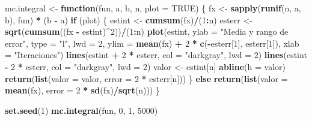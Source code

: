 \documentclass[
]{book}
\newenvironment{Shaded}{\begin{snugshade}}{\end{snugshade}}
\newcommand{\ControlFlowTok}[1]{\textcolor[rgb]{0.13,0.29,0.53}{\textbf{#1}}}
\newcommand{\DataTypeTok}[1]{\textcolor[rgb]{0.13,0.29,0.53}{#1}}
\newcommand{\DecValTok}[1]{\textcolor[rgb]{0.00,0.00,0.81}{#1}}
\newcommand{\KeywordTok}[1]{\textcolor[rgb]{0.13,0.29,0.53}{\textbf{#1}}}
\newcommand{\NormalTok}[1]{#1}
\newcommand{\OperatorTok}[1]{\textcolor[rgb]{0.81,0.36,0.00}{\textbf{#1}}}
\newcommand{\OtherTok}[1]{\textcolor[rgb]{0.56,0.35,0.01}{#1}}
\newcommand{\StringTok}[1]{\textcolor[rgb]{0.31,0.60,0.02}{#1}}
\theoremstyle{break}
\theoremstyle{definition}
\theoremstyle{definition}
\theoremstyle{definition}
\theoremstyle{remark}
\begin{document}
\begin{Shaded}
\begin{Highlighting}[]
\NormalTok{  mc.integral <-}\StringTok{ }\ControlFlowTok{function}\NormalTok{(fun, a, b, n, }\DataTypeTok{plot =} \OtherTok{TRUE}\NormalTok{) \{}
\NormalTok{    fx <-}\StringTok{ }\KeywordTok{sapply}\NormalTok{(}\KeywordTok{runif}\NormalTok{(n, a, b), fun) }\OperatorTok{*}\StringTok{ }\NormalTok{(b }\OperatorTok{-}\StringTok{ }\NormalTok{a)}
    \ControlFlowTok{if}\NormalTok{ (plot) \{}
\NormalTok{      estint <-}\StringTok{ }\KeywordTok{cumsum}\NormalTok{(fx)}\OperatorTok{/}\NormalTok{(}\DecValTok{1}\OperatorTok{:}\NormalTok{n)}
\NormalTok{      esterr <-}\StringTok{ }\KeywordTok{sqrt}\NormalTok{(}\KeywordTok{cumsum}\NormalTok{((fx }\OperatorTok{-}\StringTok{ }\NormalTok{estint)}\OperatorTok{^}\DecValTok{2}\NormalTok{))}\OperatorTok{/}\NormalTok{(}\DecValTok{1}\OperatorTok{:}\NormalTok{n)}
      \KeywordTok{plot}\NormalTok{(estint, }\DataTypeTok{ylab =} \StringTok{"Media y rango de error"}\NormalTok{, }\DataTypeTok{type =} \StringTok{"l"}\NormalTok{, }\DataTypeTok{lwd =} \DecValTok{2}\NormalTok{, }\DataTypeTok{ylim =} \KeywordTok{mean}\NormalTok{(fx) }\OperatorTok{+}\StringTok{ }
\StringTok{             }\DecValTok{2} \OperatorTok{*}\StringTok{ }\KeywordTok{c}\NormalTok{(}\OperatorTok{-}\NormalTok{esterr[}\DecValTok{1}\NormalTok{], esterr[}\DecValTok{1}\NormalTok{]), }\DataTypeTok{xlab =} \StringTok{"Iteraciones"}\NormalTok{)}
      \KeywordTok{lines}\NormalTok{(estint }\OperatorTok{+}\StringTok{ }\DecValTok{2} \OperatorTok{*}\StringTok{ }\NormalTok{esterr, }\DataTypeTok{col =} \StringTok{"darkgray"}\NormalTok{, }\DataTypeTok{lwd =} \DecValTok{2}\NormalTok{)}
      \KeywordTok{lines}\NormalTok{(estint }\OperatorTok{-}\StringTok{ }\DecValTok{2} \OperatorTok{*}\StringTok{ }\NormalTok{esterr, }\DataTypeTok{col =} \StringTok{"darkgray"}\NormalTok{, }\DataTypeTok{lwd =} \DecValTok{2}\NormalTok{)}
\NormalTok{      valor <-}\StringTok{ }\NormalTok{estint[n]}
      \KeywordTok{abline}\NormalTok{(}\DataTypeTok{h =}\NormalTok{ valor)}
      \KeywordTok{return}\NormalTok{(}\KeywordTok{list}\NormalTok{(}\DataTypeTok{valor =}\NormalTok{ valor, }\DataTypeTok{error =} \DecValTok{2} \OperatorTok{*}\StringTok{ }\NormalTok{esterr[n]))}
\NormalTok{    \} }\ControlFlowTok{else} \KeywordTok{return}\NormalTok{(}\KeywordTok{list}\NormalTok{(}\DataTypeTok{valor =} \KeywordTok{mean}\NormalTok{(fx), }\DataTypeTok{error =} \DecValTok{2} \OperatorTok{*}\StringTok{ }\KeywordTok{sd}\NormalTok{(fx)}\OperatorTok{/}\KeywordTok{sqrt}\NormalTok{(n)))}
\NormalTok{  \}}

\KeywordTok{set.seed}\NormalTok{(}\DecValTok{1}\NormalTok{)}
\KeywordTok{mc.integral}\NormalTok{(fun, }\DecValTok{0}\NormalTok{, }\DecValTok{1}\NormalTok{, }\DecValTok{5000}\NormalTok{)}
\end{Highlighting}
\end{Shaded}
\end{document}
